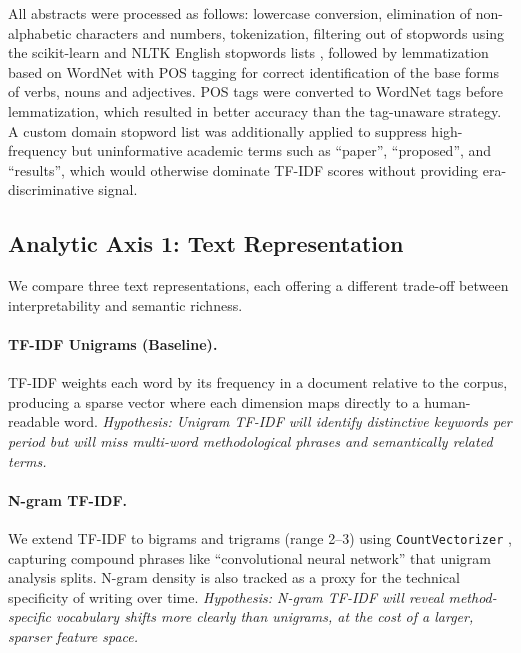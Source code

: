 \documentclass{article}
\begin{document}
All abstracts were processed as follows:
lowercase conversion, elimination of non-alphabetic
characters and numbers, tokenization, filtering out of
stopwords using the scikit-learn and NLTK English stopwords lists
\citep{scikit-learn, nltk}, followed by
lemmatization based on WordNet with POS tagging for correct
identification of the base forms of verbs, nouns and adjectives.
POS tags were converted to WordNet tags before
lemmatization, which resulted in better accuracy than
the tag-unaware strategy. A custom domain stopword list was additionally
applied to suppress high-frequency but uninformative
academic terms such as ``paper'', ``proposed'', and
``results'', which would otherwise dominate TF-IDF scores
without providing era-discriminative signal.

\subsection{Analytic Axis 1: Text Representation}
\label{subsec:representation}

We compare three text representations, each offering a
different trade-off between interpretability and semantic
richness.

\paragraph{TF-IDF Unigrams (Baseline).}
TF-IDF weights each word by its frequency in a document
relative to the corpus, producing a sparse vector where
each dimension maps directly to a human-readable word.
\textit{Hypothesis: Unigram TF-IDF will identify
distinctive keywords per period but will miss multi-word
methodological phrases and semantically related terms.}

\paragraph{N-gram TF-IDF.}
We extend TF-IDF to bigrams and trigrams (range 2--3)
using \texttt{CountVectorizer} \citep{scikit-learn},
capturing compound phrases like ``convolutional neural
network'' that unigram analysis splits. N-gram density
is also tracked as a proxy for the technical specificity
of writing over time.
\textit{Hypothesis: N-gram TF-IDF will reveal
method-specific vocabulary shifts more clearly than
unigrams, at the cost of a larger, sparser feature space.}
\end{document}
